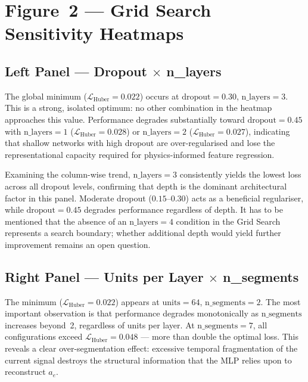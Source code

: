 \documentclass[11pt, a4paper]{article}
\newcommand{\Lhuber}{\mathcal{L}_{\text{Huber}}}
\newcommand{\ae}{a_e}
\begin{document}
\section{Figure~2 — Grid Search Sensitivity Heatmaps}
\label{sec:fig2}

\subsection{Left Panel — Dropout $\times$ n\_layers}
\label{sec:fig2left}

The global minimum ($\Lhuber = 0.022$) occurs at
$\text{dropout} = 0.30$, $\text{n\_layers} = 3$.
This is a strong, isolated optimum: no other combination in the heatmap approaches
this value.
Performance degrades substantially toward $\text{dropout} = 0.45$ with
$\text{n\_layers} = 1$ ($\Lhuber = 0.028$) or $\text{n\_layers} = 2$
($\Lhuber = 0.027$), indicating that shallow networks with high dropout are
over-regularised and lose the representational capacity required for
physics-informed feature regression.

Examining the column-wise trend, $\text{n\_layers} = 3$ consistently yields the
lowest loss across all dropout levels, confirming that depth is the dominant
architectural factor in this panel.
Moderate dropout ($0.15$–$0.30$) acts as a beneficial regulariser, while
$\text{dropout} = 0.45$ degrades performance regardless of depth.
It has to be mentioned that the absence of an $\text{n\_layers} = 4$ condition
in the Grid Search represents a search boundary; whether additional depth would
yield further improvement remains an open question.

\subsection{Right Panel — Units per Layer $\times$ n\_segments}
\label{sec:fig2right}

The minimum ($\Lhuber = 0.022$) appears at
$\text{units} = 64$, $\text{n\_segments} = 2$.
The most important observation is that performance degrades monotonically as
$\text{n\_segments}$ increases beyond~2, regardless of units per layer.
At $\text{n\_segments} = 7$, all configurations exceed $\Lhuber = 0.048$ —
more than double the optimal loss.
This reveals a clear over-segmentation effect: excessive temporal fragmentation
of the current signal destroys the structural information that the MLP relies upon
to reconstruct $\ae$.
\end{document}
